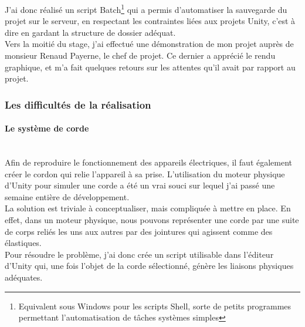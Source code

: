 \documentclass[a4paper]{article}
\begin{document}
    J'ai donc réalisé un script Batch\footnote{Equivalent sous Windows pour les scripts Shell, sorte de petits programmes permettant l'automatisation de tâches systèmes simples} qui a permis d'automatiser la sauvegarde du projet sur le serveur, en respectant les contraintes liées aux projets Unity, c'est à dire en gardant la structure de dossier adéquat. \\

    Vers la moitié du stage, j'ai effectué une démonstration de mon projet auprès de monsieur Renaud Payerne, le chef de projet. Ce dernier a apprécié le rendu graphique, et m'a fait quelques retours sur les attentes qu'il avait par rapport au projet. \\

    \subsubsection{Les difficultés de la réalisation}

    \paragraph{Le système de corde} \mbox{} \\

    Afin de reproduire le fonctionnement des appareils électriques, il faut également créer le cordon qui relie l'appareil à sa prise. L'utilisation du moteur physique d'Unity pour simuler une corde a été un vrai souci sur lequel j'ai passé une semaine entière de développement. \\

    La solution est triviale à conceptualiser, mais compliquée à mettre en place. En effet, dans un moteur physique, nous pouvons représenter une corde par une suite de corps reliés les uns aux autres par des jointures qui agissent comme des élastiques. \\

    Pour résoudre le problème, j'ai donc crée un script utilisable dans l'éditeur d'Unity qui, une fois l'objet de la corde sélectionné, génère les liaisons physiques adéquates. \\ 
\end{document}
